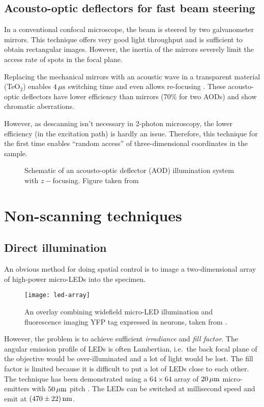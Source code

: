 \subsection{Acousto-optic deflectors for fast beam steering}
In a conventional confocal microscope, the beam is steered by two
galvanometer mirrors. This technique offers very good light throughput
and is sufficient to obtain rectangular images. However, the inertia
of the mirrors severely limit the access rate of spots in the focal
plane.

Replacing the mechanical mirrors with an acoustic wave in a
transparent material (TeO$_2$) enables $\unit[4]{\mu s}$ switching
time \citep{Otsu2008} and even allows re-focusing
\citep{Reddy2008}. These acousto-optic deflectors have lower
efficiency than mirrors (70\% for two AODs) and show chromatic
aberrations.

However, as descanning isn't necessary in 2-photon microscopy, the
lower efficiency (in the excitation path) is hardly an
issue. Therefore, this technique for the first time enables ``random
access'' of three-dimensional coordinates in the sample.

\begin{figure}[!hbt]
  \centering
  \caption{Schematic of an acousto-optic deflector (AOD) illumination
    system with $z-$focusing. Figure taken from \citet{Reddy2008}}
  \label{fig:aod}
\end{figure}


\section{Non-scanning techniques}
\subsection{Direct illumination}
An obvious method for doing spatial control is to image a
two-dimensional array of high-power micro-LEDs into the specimen.
\begin{figure}[!hbt]
  \centering
  \texttt{[image: led-array]} 
  \caption{An overlay combining widefield micro-LED illumination and
    fluorescence imaging YFP tag expressed in neurons, taken from
    \citet{grossman2010}.}
  \label{fig:led-array}
\end{figure}
However, the problem is to achieve sufficient \emph{irradiance} and
\emph{fill factor}. The angular emission profile of LEDs is often
Lambertian, i.e.\ the back focal plane of the objective would be
over-illuminated and a lot of light would be lost. The fill factor is
limited because it is difficult to put a lot of LEDs close to each
other.  The technique has been demonstrated using a $64\times64$ array
of $\unit[20]{\mu m}$ micro-emitters with $\unit[50]{\mu m}$ pitch
\citep{grossman2010}.  The LEDs can be switched at millisecond speed
and emit at $\unit[(470\pm22)]{nm}$.

